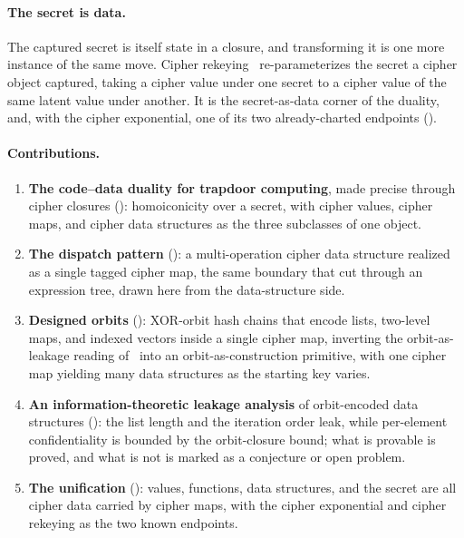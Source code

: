 \documentclass[11pt]{article}
\theoremstyle{definition}
\theoremstyle{plain}
\theoremstyle{definition}
\theoremstyle{remark}
\begin{document}
\paragraph{The secret is data.} The captured secret is itself state in
a closure, and transforming it is one more instance of the same move.
Cipher rekeying~\cite{towell2026rekeying} re-parameterizes the secret
a cipher object captured, taking a cipher value under one secret to a
cipher value of the same latent value under another. It is the
secret-as-data corner of the duality, and, with the cipher exponential,
one of its two already-charted endpoints ().

\paragraph{Contributions.}
\begin{enumerate}
\item \textbf{The code--data duality for trapdoor computing}, made
  precise through cipher closures (): homoiconicity
  over a secret, with cipher values, cipher maps, and cipher data
  structures as the three subclasses of one object.
\item \textbf{The dispatch pattern} (): a
  multi-operation cipher data structure realized as a single tagged
  cipher map, the same boundary that
  \cite{towell2026cipherprog,towell2026algebraic} cut through an
  expression tree, drawn here from the data-structure side.
\item \textbf{Designed orbits} (): XOR-orbit
  hash chains that encode lists, two-level maps, and indexed vectors
  inside a single cipher map, inverting the orbit-as-leakage reading
  of~\cite{towell2026algebraic} into an orbit-as-construction
  primitive, with one cipher map yielding many data structures as the
  starting key varies.
\item \textbf{An information-theoretic leakage analysis} of
  orbit-encoded data structures (): the list length
  and the iteration order leak, while per-element confidentiality is
  bounded by the orbit-closure bound; what is provable is proved, and
  what is not is marked as a conjecture or open problem.
\item \textbf{The unification} (): values, functions,
  data structures, and the secret are all cipher data carried by cipher
  maps, with the cipher exponential and cipher rekeying as the two
  known endpoints.
\end{enumerate}
\end{document}
